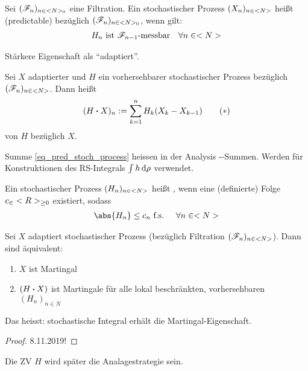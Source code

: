 \begin{*definition}[vorhersehbar]
	Sei $(\mathscr F_n)_{n\in <N>_0}$ eine Filtration. Ein stochastischer Prozess $(X_n)_{n \in <N>}$ heißt  (predictable) bezüglich $(\mathscr F_n)_{n \in <N>_0}$, wenn gilt:
	\begin{align*}
		H_n \text{ ist } \mathscr F_{n-1}\text{-messbar} \quad \forall n \in <N>
	\end{align*}
\end{*definition}
\begin{*remark}
	Stärkere Eigenschaft als ``adaptiert''.
\end{*remark}
\begin{*definition}
	Sei $X$ adaptierter und $H$ ein vorhersehbarer stochastischer Prozess bezüglich $(\mathscr F_n)_{n \in <N>}$. Dann heißt
	\begin{align*}
		(H \boldsymbol{\cdot} X)_n := \sum_{k=1}^n H_k (X_k - X_{k-1}) \tag{$\ast$}\label{eq_pred_stoch_process}
	\end{align*}
	 von $H$ bezüglich $X$.
\end{*definition}
\begin{*remark}
	Summe \eqref{eq_pred_stoch_process} heissen in der Analysis --Summen. Werden für Konstruktionen des RS-Integrals $\int h \,\mathrm{d} \rho$ verwendet.
\end{*remark}
\begin{*definition}
	Ein stochastischer Prozess $(H_n)_{n \in <N>}$ heißt , wenn eine (definierte) Folge $c_ \in <R>_{\ge 0}$ existiert, sodass
	\begin{align*}
		\abs{H_n} \le c_n \text{ f.s. } \quad \forall n \in \N
	\end{align*}
\end{*definition}
\begin{theorem}
	Sei $X$ adaptiert stochastischer Prozess (bezüglich Filtration $(\mathscr F_n)_{n \in <N>}$). Dann sind äquivalent:
	\begin{enumerate}
		\item $X$ ist Martingal
		\item $(H \boldsymbol{\cdot} X)$ ist Martingale für alle lokal beschränkten, vorhersehbaren $(H_n)_{n \in N}$
	\end{enumerate}
	Das heisst: stochastische Integral erhält die Martingal-Eigenschaft.
\end{theorem}
\begin{proof}
	8.11.2019!
\end{proof}
\begin{*remark}
	Die ZV $H$ wird später die Analagestrategie sein.
\end{*remark}